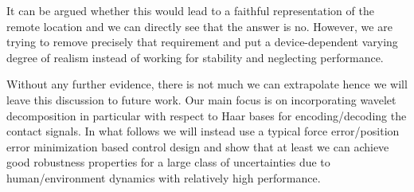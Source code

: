 It can be argued whether this would lead to a faithful representation of the remote location and we can directly see that the answer is no. 
However, we are trying to remove precisely that requirement and put a device-dependent varying degree of realism instead of working for 
stability and neglecting performance. 


Without any further evidence, there is not much we can extrapolate hence we will leave this discussion to future work. Our main focus is on
incorporating wavelet decomposition in particular with respect to Haar bases for encoding/decoding the contact signals. In what follows
we will instead use a typical force error/position error minimization based control design and show that at least we can achieve good 
robustness properties for a large class of uncertainties due to human/environment dynamics with relatively high performance. 


